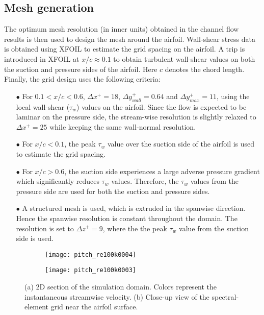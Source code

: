 \subsection{Mesh generation}

The optimum mesh resolution (in inner units) obtained in the channel flow results is then used to design the mesh around the airfoil. Wall-shear stress data is obtained using XFOIL to estimate the grid spacing on the airfoil. A trip is introduced in XFOIL at $x/c\approx0.1$ to obtain turbulent wall-shear values on both the suction and pressure sides of the airfoil. Here $c$ denotes the chord length. Finally, the grid design uses the following criteria:

\begin{itemize}
	\item[$\bullet$] For $0.1<x/c<0.6$, $\Delta x^{+}=18$, $\Delta y_{wall}^{+}=0.64$ and $\Delta y_{max}^{+}=11$, using the local wall-shear ($\tau_{w}$) values on the airfoil. Since the flow is expected to be laminar on the pressure side, the stream-wise resolution is slightly relaxed to $\Delta x^{+}=25$ while keeping the same wall-normal resolution.
	\item[$\bullet$] For $x/c<0.1$, the peak $\tau_{w}$ value over the suction side of the airfoil is used to estimate the grid spacing.
	\item [$\bullet$] For $x/c>0.6$, the suction side experiences a large adverse pressure gradient which significantly reduces $\tau_{w}$ values. Therefore, the $\tau_{w}$ values from the pressure side are used for both the suction and pressure sides.
	\item [$\bullet$] A structured mesh is used, which is extruded in the spanwise direction. Hence the spanwise resolution is constant throughout the domain. The resolution is set to $\Delta z^{+}=9$, where the the peak $\tau_{w}$ value from the suction side is used.
\end{itemize}

\begin{figure}[h]
	\begin{subfigure}[t]{0.49\textwidth}
		\centering
		\caption{}		
		\texttt{[image: pitch\_re100k0004]}
		\label{fig:re100k_domain}
	\end{subfigure}	
	\begin{subfigure}[t]{0.49\textwidth}
		\centering
		\caption{}		
		\texttt{[image: pitch\_re100k0003]}
		\label{fig:re100k_grid}
	\end{subfigure}
	\caption{(a) 2D section of the simulation domain. Colors represent the instantaneous streamwise velocity. (b) Close-up view of the spectral-element grid near the airfoil surface.}	
\end{figure}


